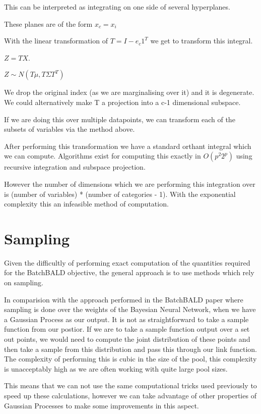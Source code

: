 \documentclass[12pt, a4paper]{report}
\theoremstyle{definition}
\begin{document}
This can be interpreted as integrating on one side of several hyperplanes.

These planes are of the form $x_c = x_i$

With the linear transformation of $T = I - e_c 1^T$ we get to transform this integral.

$Z = TX$.

$Z \sim N(T \mu, T \Sigma T^T)$

We drop the original index (as we are marginalising over it) and it is degenerate. We could alternatively make T a projection into a c-1 dimensional subspace.

If we are doing this over multiple datapoints, we can transform each of the subsets of variables via the method above.

After performing this transformation we have a standard orthant integral which we can compute. Algorithms exist for computing this exactly in $O(p^2 2^p)$ using recursive integration and subspace projection. \cite{orthant}


However the number of dimensions which we are performing this integration over is (number of variables) * (number of categories - 1). With the exponential complexity this an infeasible method of computation.



\section{Sampling}

Given the difficultly of performing exact computation of the quantities required for the BatchBALD objective, the general approach is to use methods which rely on sampling.

In comparision with the approach performed in the BatchBALD paper where sampling is done over the weights of the Bayesian Neural Network, when we have a Gaussian Process as our output. It is not as straightforward to take a sample function from our postior. If we are to take a sample function output over a set out points, we would need to compute the joint distribution of these points and then take a sample from this distribution and pass this through our link function.
The complexity of performing this is cubic in the size of the pool, this complexity is unacceptably high as we are often working with quite large pool sizes.

This means that we can not use the same computational tricks used previously to speed up these calculations, however we can take advantage of other properties of Gaussian Processes to make some improvements in this aspect.
\end{document}
